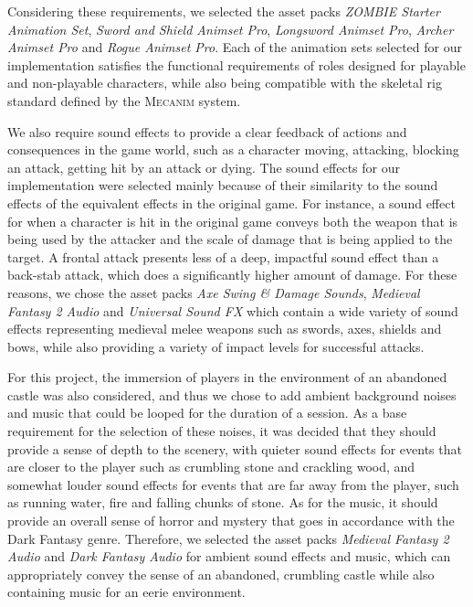 Considering these requirements, we selected the asset packs \emph{ZOMBIE Starter Animation Set}, \emph{Sword and Shield Animset Pro}, \emph{Longsword Animset Pro}, \emph{Archer Animset Pro} and \emph{Rogue Animset Pro}. Each of the animation sets selected for our implementation satisfies the functional requirements of roles designed for playable and non-playable characters, while also being compatible with the skeletal rig standard defined by the \textsc{Mecanim} system.

We also require sound effects to provide a clear feedback of actions and consequences in the game world, such as a character moving, attacking, blocking an attack, getting hit by an attack or dying. The sound effects for our implementation were selected mainly because of their similarity to the sound effects of the equivalent effects in the original game. For instance, a sound effect for when a character is hit in the original game conveys both the weapon that is being used by the attacker and the scale of damage that is being applied to the target. A frontal attack presents less of a deep, impactful sound effect than a back-stab attack, which does a significantly higher amount of damage. For these reasons, we chose the asset packs \emph{Axe Swing \& Damage Sounds}, \emph{Medieval Fantasy 2 Audio} and \emph{Universal Sound FX} which contain a wide variety of sound effects representing medieval melee weapons such as swords, axes, shields and bows, while also providing a variety of impact levels for successful attacks.

For this project, the immersion of players in the environment of an abandoned castle was also considered, and thus we chose to add ambient background noises and music that could be looped for the duration of a session. As a base requirement for the selection of these noises, it was decided that they should provide a sense of depth to the scenery, with quieter sound effects for events that are closer to the player such as crumbling stone and crackling wood, and somewhat louder sound effects for events that are far away from the player, such as running water, fire and falling chunks of stone. As for the music, it should provide an overall sense of horror and mystery that goes in accordance with the Dark Fantasy genre. Therefore, we selected the asset packs \emph{Medieval Fantasy 2 Audio} and \emph{Dark Fantasy Audio} for ambient sound effects and music, which can appropriately convey the sense of an abandoned, crumbling castle while also containing music for an eerie environment.

